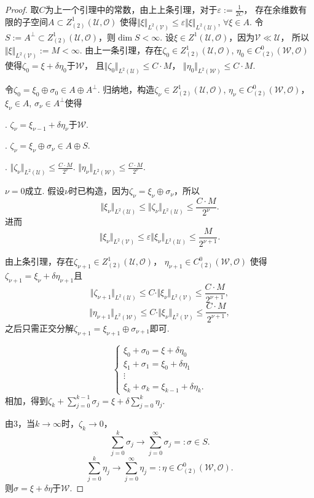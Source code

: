 \begin{proof}
	取$C$为上一个引理中的常数，由上上条引理，对于$\varepsilon:=\frac{1}{2C}$，
    存在余维数有限的子空间$A\subset Z^1_{(2)}(\mathscr{U},\mathcal{O})$
    使得$\Vert \xi\Vert_{L^2(\mathscr{V})}
    \leq \varepsilon \Vert \xi \Vert_{L^2(\mathscr{U})}$, $\forall \xi \in A$.
	令$S:=A^{\perp}\subset Z^1_{(2)}(\mathscr{U},\mathcal{O})$，则$\dim S<\infty$. 
    设$\xi \in Z^1(\mathscr{U},\mathcal{O})$，因为$\mathscr{V}\ll\mathscr{U}$，
    所以$\Vert \xi \Vert_{L^2(\mathscr{V})}:=M<\infty$. 
    由上一条引理，存在$\zeta_0\in Z^1_{(2)}(\mathscr{U},\mathcal{O})$, 
    $\eta_0\in C^0_{(2)}(\mathscr{W},\mathcal{O})$
    使得$\zeta_0=\xi+\delta \eta_0$于$\mathscr{W}$，
    且$\Vert \zeta_0 \Vert_{L^2(\mathscr{U})}\leq C\cdot M$，
    $\Vert \eta_0\Vert_{L^2(\mathscr{W})}\leq C\cdot M$.

	令$\zeta_0=\xi_0\oplus \sigma_0\in A\oplus A^{\perp}$. 
    归纳地，构造$\zeta_\nu \in Z^1_{(2)}(\mathscr{U},\mathcal{O})$, 
    $\eta_\nu \in C^0_{(2)}(\mathscr{W},\mathcal{O})$，
    $\xi_\nu \in A$, $\sigma_\nu \in A^{\perp}$使得
	
	. $\zeta_\nu=\xi_{\nu-1}+\delta \eta_\nu$于$\mathscr{W}$.

	. $\zeta_\nu=\xi_\nu \oplus \sigma_\nu\in A\oplus S$.

	. $\Vert \zeta_\nu \Vert_{L^2(\mathscr{U})}\leq \frac{C\cdot M}{2^\nu}$. 
    $\Vert \eta_\nu \Vert_{L^2(\mathscr{W})}\leq \frac{C\cdot M}{2^\nu}$.

	$\nu=0$成立. 假设$\nu$时已构造，因为$\zeta_\nu=\xi_\nu\oplus \sigma_\nu$，所以
	$$\Vert \xi_\nu \Vert_{L^2(\mathscr{U})}
    \leq \Vert \zeta_\nu \Vert_{L^2(\mathscr{U})}\leq \frac{C\cdot M}{2^\nu}.$$
	进而$$\Vert \xi_\nu \Vert_{L^2(\mathscr{V})}
    \leq \varepsilon \Vert \xi_\nu \Vert_{L^2(\mathscr{U})} 
    \leq \frac{M}{2^{\nu+1}}.$$
			
	由上条引理，存在$\zeta_{\nu+1}\in Z^1_{(2)}(\mathscr{U},\mathcal{O})$，
    $\eta_{\nu+1}\in C^0_{(2)}(\mathscr{W},\mathcal{O})$
    使得$\zeta_{\nu+1}=\xi_\nu+\delta \eta_{\nu+1}$且
	$$\Vert \zeta_{\nu+1} \Vert_{L^2(\mathscr{U})}
    \leq C\cdot \Vert \xi_\nu \Vert_{L^2(\mathscr{V})}
    \leq \frac{C\cdot M}{2^{\nu+1}},$$
	$$\Vert \eta_{\nu+1} \Vert_{L^2(\mathscr{W})}
    \leq C\cdot \Vert \xi_\nu \Vert_{L^2(\mathscr{V})}
    \leq \frac{C\cdot M}{2^{\nu+1}},$$
	之后只需正交分解$\zeta_{\nu+1}=\xi_{\nu+1}\oplus \sigma_{\nu+1}$即可.

	$$\begin{cases}
	    \xi_0+\sigma_0=\xi +\delta\eta_0\\
		\xi_1+\sigma_1=\xi_0+\delta \eta_1\\
		\vdots \\
		\xi_k+\sigma_k=\xi_{k-1}+\delta \eta_k.
	\end{cases}$$
	相加，得到$\zeta_k+\sum\limits_{j=0}^{k-1} \sigma_j
    =\xi +\delta \sum\limits_{j=0}^k \eta_j$.
			
	由3，当$k\to \infty$时，$\zeta_k\to 0$，
	$$\sum_{j=0}^k \sigma_j \to \sum_{j=0}^\infty \sigma_j=:\sigma \in S.$$
	$$\sum_{j=0}^k \eta_j \to \sum_{j=0}^\infty \eta_j
    =:\eta\in C^0_{(2)}(\mathscr{W},\mathcal{O}).$$
	则$\sigma=\xi+\delta \eta$于$\mathscr{W}$.
\end{proof}

